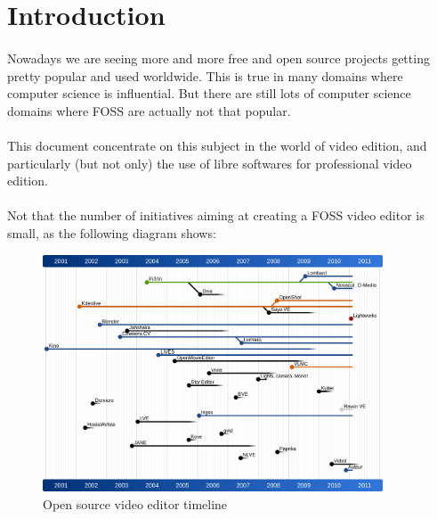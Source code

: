 \newpage
%
\section{Introduction}
    \paragraph{}
        Nowadays we are seeing more and more free and open source projects
        getting pretty popular and used worldwide. This is true in many
        domains where computer science is influential. But there are
        still lots of computer science domains where FOSS are actually not that
        popular.

    \paragraph{}
        This document concentrate on this subject in the world of video
        edition, and particularly (but not only) the use of libre softwares
        for professional video edition.

    \paragraph{}
        Not that the number of initiatives aiming at creating a FOSS video
        editor is small, as the following diagram shows:

        \begin{figure}[!htbp]
            \begin{center}
                \includegraphics[width=0.9\textwidth]{images/open-source-video-editor-timeline}
            \end{center}
            \caption{Open source video editor timeline}
            \label{Yes}
        \end{figure}

